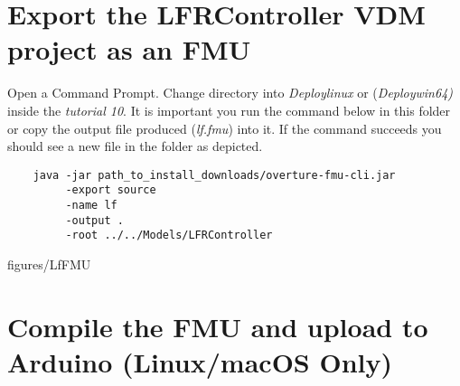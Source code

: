 \documentclass[11pt,a4paper]{../tutorial}
\begin{document}
\section{Export the LFRController VDM project as an FMU}

\begin{instructions} 

\item Open a Command Prompt. Change directory into  \emph{Deploy\pathsep linux} or (\emph{Deploy\pathsep win64)}   inside the \emph{tutorial 10}. It is important you run the command below in this folder or copy the output file produced (\emph{lf.fmu})  into it. If the command succeeds you should see a new file in the folder as depicted.
	\begin{verbatim}
	java -jar path_to_install_downloads/overture-fmu-cli.jar 
	     -export source 
	     -name lf 
	     -output . 
	     -root ../../Models/LFRController
	\end{verbatim}

	\begin{annotation}[width=0.85\linewidth]{figures/LfFMU}
	\end{annotation}

\end{instructions}

\newpage

\section{Compile the FMU and upload to Arduino (Linux/macOS Only)}
\end{document}
